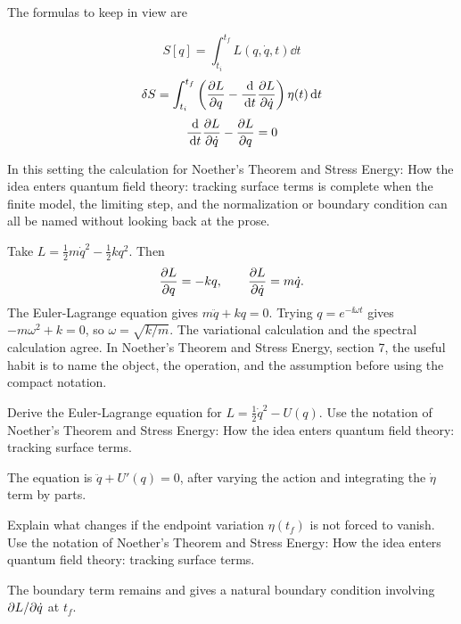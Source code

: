 The formulas to keep in view are

\[
  S[q]=\int_{t_i}^{t_f}L(q,\dot q,t)\dd t
\]
\[
  \delta S=\int_{t_i}^{t_f}\left(\frac{\partial L}{\partial q}-\frac{\,\mathrm d}{\,\mathrm d t}\frac{\partial L}{\partial\dot q}\right)\eta(t)\,\mathrm d t
\]
\[
  \frac{\,\mathrm d}{\,\mathrm d t}\frac{\partial L}{\partial\dot q}-\frac{\partial L}{\partial q}=0
\]

In this setting the calculation for Noether's Theorem and Stress Energy: How the idea enters quantum field theory: tracking surface terms is complete when the finite model, the limiting step, and the normalization or boundary condition can all be named without looking back at the prose.




\begin{example}
Take \(L=\frac12m\dot q^2-\frac12kq^2\).  Then
\[
  \frac{\partial L}{\partial q}=-kq,\qquad \frac{\partial L}{\partial\dot q}=m\dot q.
\]
The Euler-Lagrange equation gives \(m\ddot q+kq=0\).  Trying \(q=e^{-\ii\omega t}\) gives \(-m\omega^2+k=0\), so \(\omega=\sqrt{k/m}\).  The variational calculation and the spectral calculation agree.  In Noether's Theorem and Stress Energy, section 7, the useful habit is to name the object, the operation, and the assumption before using the compact notation.
\end{example}



\begin{exercise}
Derive the Euler-Lagrange equation for \(L=\frac12\dot q^2-U(q)\).  Use the notation of Noether's Theorem and Stress Energy: How the idea enters quantum field theory: tracking surface terms.
\begin{answer}
The equation is \(\ddot q+U'(q)=0\), after varying the action and integrating the \(\dot\eta\) term by parts.
\end{answer}
\end{exercise}

\begin{exercise}
Explain what changes if the endpoint variation \(\eta(t_f)\) is not forced to vanish.  Use the notation of Noether's Theorem and Stress Energy: How the idea enters quantum field theory: tracking surface terms.
\begin{answer}
The boundary term remains and gives a natural boundary condition involving \(\partial L/\partial\dot q\) at \(t_f\).
\end{answer}
\end{exercise}



